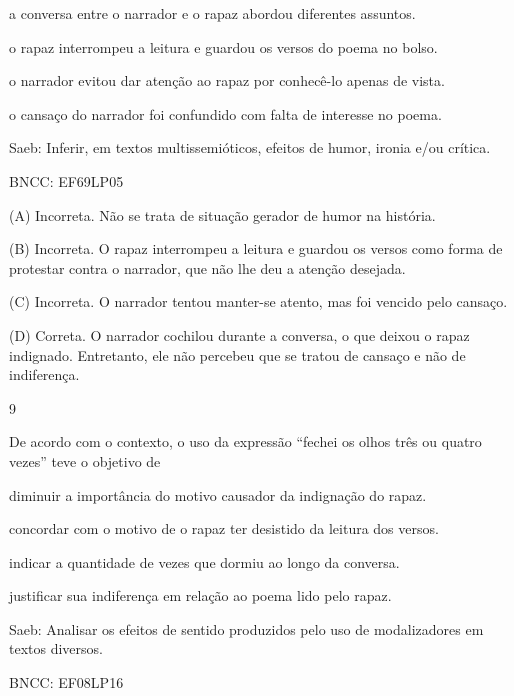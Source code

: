 \begin{escolha}
\item a conversa entre o narrador e o rapaz abordou diferentes assuntos.

\item o rapaz interrompeu a leitura e guardou os versos do poema no bolso.

\item o narrador evitou dar atenção ao rapaz por conhecê-lo apenas de
vista.

\item o cansaço do narrador foi confundido com falta de interesse no poema.
\end{escolha}

Saeb: Inferir, em textos multissemióticos, efeitos de humor, ironia e/ou
crítica.

BNCC: EF69LP05

(A) Incorreta. Não se trata de situação gerador de humor na história.

(B) Incorreta. O rapaz interrompeu a leitura e guardou os versos como
forma de protestar contra o narrador, que não lhe deu a atenção
desejada.

(C) Incorreta. O narrador tentou manter-se atento, mas foi vencido pelo
cansaço.

(D) Correta. O narrador cochilou durante a conversa, o que deixou o
rapaz indignado. Entretanto, ele não percebeu que se tratou de cansaço e
não de indiferença.

\num{9}

De acordo com o contexto, o uso da expressão ``fechei os olhos três ou
quatro vezes'' teve o objetivo de

\begin{escolha}
\item diminuir a importância do motivo causador da indignação do rapaz.

\item concordar com o motivo de o rapaz ter desistido da leitura dos
versos.

\item indicar a quantidade de vezes que dormiu ao longo da conversa.

\item justificar sua indiferença em relação ao poema lido pelo rapaz.
\end{escolha}

Saeb: Analisar os efeitos de sentido produzidos pelo uso de
modalizadores em textos diversos.

BNCC: EF08LP16

